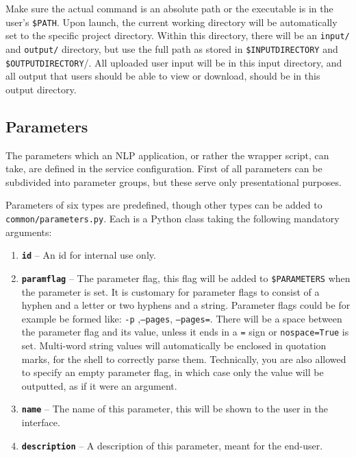 \documentclass[a4paper,12pt]{report}
\begin{document}
Make sure the actual command is an absolute path or the executable is in the user's \texttt{\$PATH}. Upon launch, the current working directory will be automatically set to the specific project directory. Within this directory, there will be an \texttt{input/} and \texttt{output/} directory, but use the full path as stored in \texttt{\$INPUTDIRECTORY} and \texttt{\$OUTPUTDIRECTORY}/. All uploaded user input will be in this input directory, and all output that users should be able to view or download, should be in this output directory.

\subsection{Parameters}
\label{sec:parameters}

The parameters which an NLP application, or rather the wrapper script, can take, are defined in the service configuration. First of all parameters can be subdivided into parameter groups, but these serve only presentational purposes. 

Parameters of six types are predefined, though other types can be added to \texttt{common/parameters.py}. Each is a Python class taking the following mandatory arguments:

\begin{enumerate}
\item \textbf{\texttt{id}} -- An id for internal use only.
\item \textbf{\texttt{paramflag}} -- The parameter flag, this flag will be added to \texttt{\$PARAMETERS} when the parameter is set. It is customary for parameter flags to consist of a hyphen and a letter or two hyphens and a string. Parameter flags could be for example be formed like: \texttt{-p} ,\texttt{--pages}, \texttt{--pages=}. There will be a space between the parameter flag and its value, unless it ends in a \texttt{=} sign or \texttt{nospace=True} is set. Multi-word string values will automatically be enclosed in quotation marks, for the shell to correctly parse them. Technically, you are also allowed to specify an empty parameter flag, in which case only the value will be outputted, as if it were an argument.
\item \textbf{\texttt{name}} -- The name of this parameter, this will be shown to the user in the interface.
\item \textbf{\texttt{description}} -- A description of this parameter, meant for the end-user.
\end{enumerate}
\end{document}
